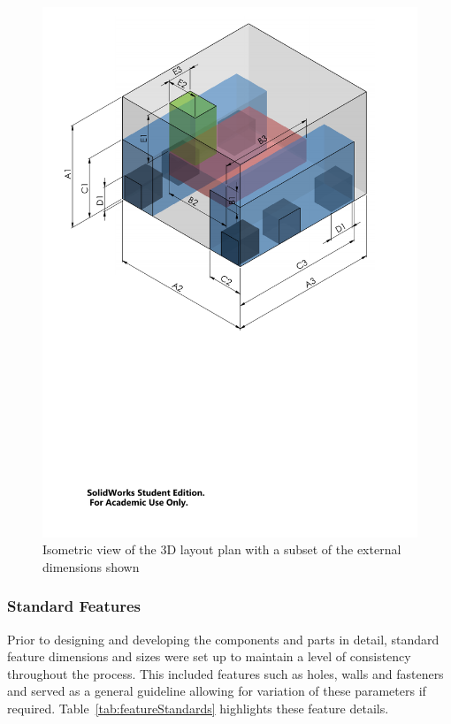       \begin{figure}[H]
        \centering
        \includegraphics[clip, trim=1cm 11cm 1cm 0cm, width=0.9\linewidth]{figures/mechDesign-layoutPlan}
        \caption[Isometric view of the 3D layout plan with a subset of the external dimensions shown]{Isometric view of the 3D layout plan with a subset of the external dimensions shown}
        \label{fig:mechDesign-layoutPlan}
      \end{figure}

      
    \subsubsection{Standard Features}
      Prior to designing and developing the components and parts in detail, standard feature dimensions and sizes were set up to maintain a level of consistency throughout the process. This included features such as holes, walls and fasteners and served as a general guideline allowing for variation of these parameters if required. Table~\ref{tab:featureStandards} highlights these feature details.
      
